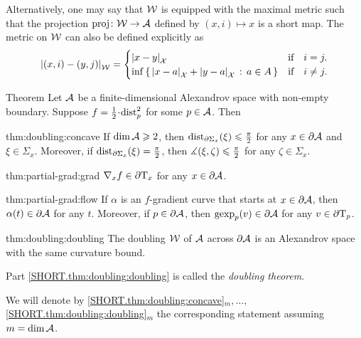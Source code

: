 Alternatively, one may say that $\mathcal{W}$ is equipped with the maximal metric such that the projection $\operatorname{\rm proj}\nolimits\colon\mathcal{W}\to\mathcal{A}$ defined by $(x,i)\mapsto x$ is a short map. 
The metric on $\mathcal{W}$ can also be defined explicitly as
\[|{(x,i)}-{(y,j)}|_{\mathcal{W}}^{{}}=
\begin{cases}
|{x}-{y}|_{\mathcal{X}}^{{}}&\text{if}\quad i= j.
\\
\inf\left\{\,{|{x}-{a}|_{\mathcal{X}}^{{}}+|{y}-{a}|_{\mathcal{X}}^{{}}}\,:\,{a\in A}\,\right\}&\text{if}\quad i\ne j.
\end{cases}
\]

\begin{thm}{Theorem}\label{thm:doubling}
Let $\mathcal{A}$ be a finite-dimensional Alexandrov space with non-empty boundary.
Suppose $f\z=\tfrac12\cdot\distfun_p^2$ for some $p\in \mathcal{A}$.
Then

\begin{subthm}{thm:doubling:concave}
If $\operatorname{\rm dim}\nolimits \mathcal{A}\geqslant 2$, then
$\mathrm{dist}_{\partial \Sigma_x}(\xi)\leqslant \tfrac\pi2$ for any $x\in\partial \mathcal{A}$ and $\xi\in \Sigma_x$.
Moreover, if $\mathrm{dist}_{\partial \Sigma_x}(\xi)= \tfrac\pi2$, then $\measuredangle(\xi,\zeta)\leqslant\tfrac\pi2$ for any $\zeta\in \Sigma_x$. 
\end{subthm}

\begin{subthm}{thm:partial-grad:grad}
$\nabla_xf\in \partial\mathrm{T}_x$ for any $x\in\partial \mathcal{A}$.
\end{subthm}

\begin{subthm}{thm:partial-grad:flow}
If $\alpha$ is an $f$-gradient curve that starts at $x\in \partial \mathcal{A}$, then $\alpha(t)\in \partial \mathcal{A}$ for any $t$.
Moreover, if $p\in \partial \mathcal{A}$, then $\operatorname{\rm gexp}\nolimits_p(v)\in \partial \mathcal{A}$ for any $v\in\partial\mathrm{T}_p$.
\end{subthm}

\begin{subthm}{thm:doubling:doubling}
The doubling $\mathcal{W}$ of $\mathcal{A}$ across $\partial \mathcal{A}$ is an Alexandrov space with the same curvature bound.
\end{subthm}

\end{thm}

Part \ref{SHORT.thm:doubling:doubling} is called the \emph{doubling theorem}.

We will denote by 
\ref{SHORT.thm:doubling:concave}$_m,\dots,$\ref{SHORT.thm:doubling:doubling}$_m$ the corresponding statement assuming $m=\operatorname{\rm dim}\nolimits\mathcal{A}$.

